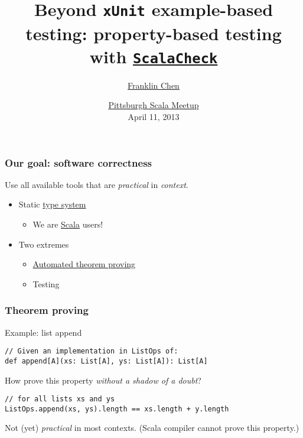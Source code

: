 \documentclass{beamer}
\title{Beyond \texttt{xUnit} example-based testing: property-based testing with \href{https://github.com/rickynils/scalacheck}{\texttt{ScalaCheck}}}
\author{\href{http://franklinchen.com/}{Franklin Chen}}
\date{\href{http://www.meetup.com/Pittsburgh-Scala-Meetup/events/108080782}{Pittsburgh Scala Meetup} \\
April 11, 2013
}
\begin{document}
\begin{frame}
  \titlepage
\end{frame}


\begin{frame}
  \frametitle{Our goal: software correctness}

   Use all available tools that are \emph{practical} in \emph{context}.

  \begin{itemize}
    \item<2-> Static \href{http://en.wikipedia.org/wiki/Type\_system}{type system}
      \begin{itemize}
        \item<3-> We are \href{http://www.scala-lang.org/}{Scala} users!
      \end{itemize}
    \item<4-> Two extremes
      \begin{itemize}
        \item<5-> \href{http://en.wikipedia.org/wiki/Automated\_theorem\_proving}{Automated theorem proving}
        \item<6-> Testing
      \end{itemize}
  \end{itemize}

\end{frame}

\begin{frame}[fragile]
  \frametitle{Theorem proving}

  \begin{block}{Example: list append}
    \begin{verbatim}
// Given an implementation in ListOps of:
def append[A](xs: List[A], ys: List[A]): List[A]
    \end{verbatim}
  \end{block}

  \begin{block}{How prove this property \emph{without a shadow of a doubt}?}
    \begin{verbatim}
// for all lists xs and ys
ListOps.append(xs, ys).length == xs.length + y.length
    \end{verbatim}
  \end{block}

  \begin{block}{Not (yet) \emph{practical} in most contexts.}
    (Scala compiler cannot prove this property.)
  \end{block}
\end{frame}
\end{document}
